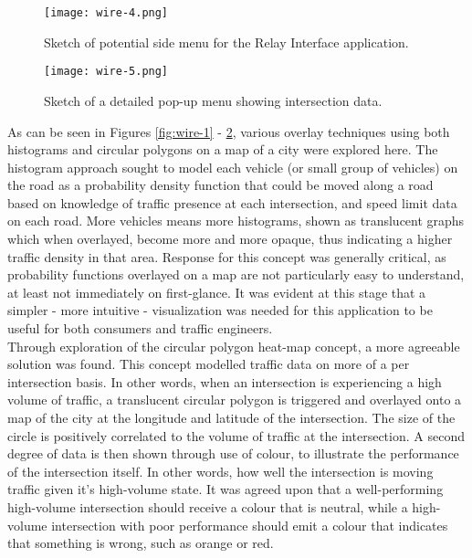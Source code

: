 \documentclass{article}
\begin{document}
\begin{figure}[htbp!]
  \begin{centering}
    \texttt{[image: wire-4.png]}
    \caption{Sketch of potential side menu for the Relay Interface application.}
    \label{fig:wire-3}
  \end{centering}
\end{figure}

\begin{figure}[htbp!]
  \begin{centering}
    \texttt{[image: wire-5.png]}
    \caption{Sketch of a detailed pop-up menu showing intersection data.}
    \label{fig:wire-4}
  \end{centering}
\end{figure}

As can be seen in Figures \ref{fig:wire-1} - \ref{fig:wire-4}, various overlay techniques using both histograms and circular polygons on a map of a city were explored here.
The histogram approach sought to model each vehicle (or small group of vehicles) on the road as a probability density function that could be moved along a road based on knowledge of traffic presence at each intersection, and speed limit data on each road.
More vehicles means more histograms, shown as translucent graphs which when overlayed, become more and more opaque, thus indicating a higher traffic density in that area.
Response for this concept was generally critical, as probability functions overlayed on a map are not particularly easy to understand, at least not immediately on first-glance.
It was evident at this stage that a simpler - more intuitive - visualization was needed for this application to be useful for both consumers and traffic engineers.\\

Through exploration of the circular polygon heat-map concept, a more agreeable solution was found.
This concept modelled traffic data on more of a per intersection basis.
In other words, when an intersection is experiencing a high volume of traffic, a translucent circular polygon is triggered and overlayed onto a map of the city at the longitude and latitude of the intersection.
The size of the circle is positively correlated to the volume of traffic at the intersection.
A second degree of data is then shown through use of colour, to illustrate the performance of the intersection itself.
In other words, how well the intersection is moving traffic given it's high-volume state.
It was agreed upon that a well-performing high-volume intersection should receive a colour that is neutral, while a high-volume intersection with poor performance should emit a colour that indicates that something is wrong, such as orange or red.\\
 
\end{document}
